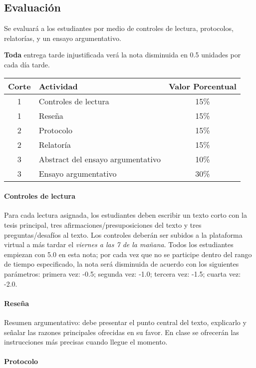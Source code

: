 \documentclass[]{article}
\let\oldparagraph\paragraph
\renewcommand{\paragraph}[1]{\oldparagraph{#1}\mbox{}}
\begin{document}
\subsection{Evaluación}\label{evaluaciuxf3n}

Se evaluará a los estudiantes por medio de controles de lectura,
protocolos, relatorías, y un ensayo argumentativo.

\textbf{Toda} entrega tarde injustificada verá la nota disminuida en 0.5
unidades por cada día tarde.

\begin{longtable}[]{@{}clc@{}}
\toprule
Corte & Actividad & Valor Porcentual\tabularnewline
\midrule
\endhead
1 & Controles de lectura & 15\%\tabularnewline
1 & Reseña & 15\%\tabularnewline
2 & Protocolo & 15\%\tabularnewline
2 & Relatoría & 15\%\tabularnewline
3 & Abstract del ensayo argumentativo & 10\%\tabularnewline
3 & Ensayo argumentativo & 30\%\tabularnewline
\bottomrule
\end{longtable}

\paragraph{Controles de lectura}\label{controles-de-lectura}

Para cada lectura asignada, los estudiantes deben escribir un texto
corto con la tesis principal, tres afirmaciones/presuposiciones del
texto y tres preguntas/desafíos al texto. Los controles deberán ser
subidos a la plataforma virtual a más tardar el \emph{viernes a las 7 de
la mañana}. Todos los estudiantes empiezan con 5.0 en esta nota; por
cada vez que no se participe dentro del rango de tiempo especificado, la
nota será disminuida de acuerdo con los siguientes parámetros: primera
vez: -0.5; segunda vez: -1.0; tercera vez: -1.5; cuarta vez: -2.0.

\paragraph{Reseña}\label{reseuxf1a}

Resumen argumentativo: debe presentar el punto central del texto,
explicarlo y señalar las razones principales ofrecidas en su favor. En
clase se ofrecerán las instrucciones más precisas cuando llegue el
momento.

\paragraph{Protocolo}\label{protocolo}
\end{document}

